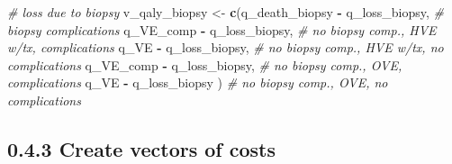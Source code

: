\documentclass[
]{article}
\newenvironment{Shaded}{\begin{snugshade}}{\end{snugshade}}
\newcommand{\CommentTok}[1]{\textcolor[rgb]{0.56,0.35,0.01}{\textit{#1}}}
\newcommand{\FunctionTok}[1]{\textcolor[rgb]{0.13,0.29,0.53}{\textbf{#1}}}
\newcommand{\NormalTok}[1]{#1}
\newcommand{\OtherTok}[1]{\textcolor[rgb]{0.56,0.35,0.01}{#1}}
\newcommand{\SpecialCharTok}[1]{\textcolor[rgb]{0.81,0.36,0.00}{\textbf{#1}}}
\begin{document}
\begin{Shaded}
\begin{Highlighting}[]
\CommentTok{\# loss due to biopsy}
\NormalTok{v\_qaly\_biopsy }\OtherTok{\textless{}{-}}  \FunctionTok{c}\NormalTok{(q\_death\_biopsy }\SpecialCharTok{{-}}\NormalTok{ q\_loss\_biopsy,   }\CommentTok{\# biopsy complications}
\NormalTok{                    q\_VE\_comp      }\SpecialCharTok{{-}}\NormalTok{ q\_loss\_biopsy,   }\CommentTok{\# no biopsy comp., HVE w/tx, complications }
\NormalTok{                    q\_VE           }\SpecialCharTok{{-}}\NormalTok{ q\_loss\_biopsy,   }\CommentTok{\# no biopsy comp., HVE w/tx, no complications}
\NormalTok{                    q\_VE\_comp      }\SpecialCharTok{{-}}\NormalTok{ q\_loss\_biopsy,   }\CommentTok{\# no biopsy comp., OVE, complications}
\NormalTok{                    q\_VE           }\SpecialCharTok{{-}}\NormalTok{ q\_loss\_biopsy )  }\CommentTok{\# no biopsy comp., OVE, no complications}
\end{Highlighting}
\end{Shaded}

\hypertarget{create-vectors-of-costs}{%
\subsection{0.4.3 Create vectors of
costs}\label{create-vectors-of-costs}}
\end{document}
